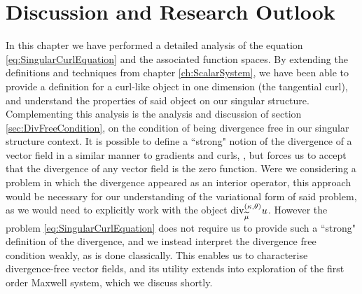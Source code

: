\section{Discussion and Research Outlook} \label{sec:CC-Discussion}
In this chapter we have performed a detailed analysis of the equation \eqref{eq:SingularCurlEquation} and the associated function spaces.
By extending the definitions and techniques from chapter \ref{ch:ScalarSystem}, we have been able to provide a definition for a curl-like object in one dimension (the tangential curl), and understand the properties of said object on our singular structure.
Complementing this analysis is the analysis and discussion of section \ref{sec:DivFreeCondition}, on the condition of being divergence free in our singular structure context.
It is possible to define a ``strong" notion of the divergence of a vector field in a similar manner to gradients and curls, , but forces us to accept that the divergence of any vector field is the zero function.
Were we considering a problem in which the divergence appeared as an interior operator, this approach would be necessary for our understanding of the variational form of said problem, as we would need to explicitly work with the object $\mathrm{div}_{\widetilde{\mu}}^{\left( \kappa, \theta \right)}u$.
However the problem \eqref{eq:SingularCurlEquation} does not require us to provide such a ``strong" definition of the divergence, and we instead interpret the divergence free condition weakly, as is done classically.
This enables us to characterise divergence-free vector fields, and its utility extends into exploration of the first order Maxwell system, which we discuss shortly.


